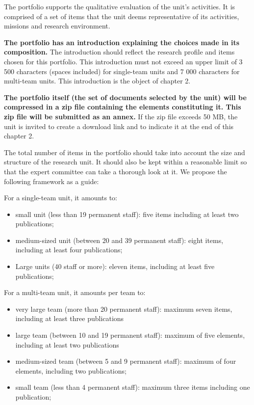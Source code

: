 \begin{hceresinstructions}
  The portfolio supports the qualitative evaluation of the unit's
  activities. It is comprised of a set of items that the unit deems
  representative of its activities, missions and research environment.

  \textbf{The portfolio has an introduction explaining the choices made in
  its composition.} The introduction should reflect the research profile
  and items chosen for this portfolio. This introduction must not exceed
  an upper limit of 3 500 characters (spaces included) for single-team
  units and 7 000 characters for multi-team units. This introduction is
  the object of chapter 2.

  \textbf{The portfolio itself (the set of documents selected by the unit)
  will be compressed in a zip file containing the elements constituting
  it. This zip file will be submitted as an annex.}
  If the zip file
  exceeds 50 MB, the unit is invited to create a download link and to
  indicate it at the end of this chapter 2.

  The total number of items in the portfolio should take into account the
  size and structure of the research unit. It should also be kept within a
  reasonable limit so that the expert committee can take a thorough look
  at it. We propose the following framework as a guide:

  For a single-team unit, it amounts to:

  \begin{itemize}
  \item
    small unit (less than 19 permanent staff): five items including at
    least two publications;
  \item
    medium-sized unit (between 20 and 39 permanent staff): eight items,
    including at least four publications;
  \item
    Large units (40 staff or more): eleven items, including at least five
    publications;
  \end{itemize}

  For a multi-team unit, it amounts per team to:

  \begin{itemize}
  \item
    very large team (more than 20 permanent staff): maximum seven items,
    including at least three publications
  \item
    large team (between 10 and 19 permanent staff): maximum of five
    elements, including at least two publications
  \item
    medium-sized team (between 5 and 9 permanent staff): maximum of four
    elements, including two publications;
  \item
    small team (less than 4 permanent staff): maximum three items including one publication;
  \end{itemize}


\end{hceresinstructions}
